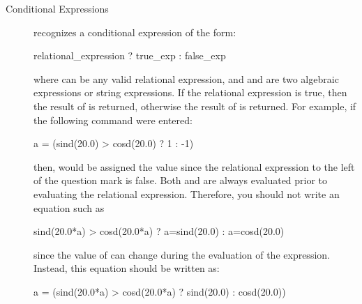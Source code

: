 \begin{description}
\item[Conditional Expressions] \aprepro{} recognizes a conditional 
expression of the form:
\begin{apinp}
relational\_expression ? true\_exp :  false\_exp
\end{apinp}
where  can be any valid
relational expression, and  and
 are two algebraic expressions or string expressions. If the
relational expression is true, then the result of
 is returned, otherwise the result of
 is returned. For example, if the
following command were entered:
\begin{apinp}
a = (sind(20.0) > cosd(20.0) ? 1 : -1)
\end{apinp}
then,  would be assigned the value  since the relational expression 
to the left of the question mark is false. Both \textit{} and 
\textit{} are always evaluated prior to evaluating the relational 
expression. Therefore, you should not write an equation such as
\begin{apinp}
sind(20.0*a) > cosd(20.0*a) ? a=sind(20.0) : a=cosd(20.0)
\end{apinp}
since the value of  can change during the evaluation of the expression. 
Instead, this equation should be written as:
\begin{apinp}
a = (sind(20.0*a) > cosd(20.0*a) ? sind(20.0) : cosd(20.0))
\end{apinp}
\end{description}
